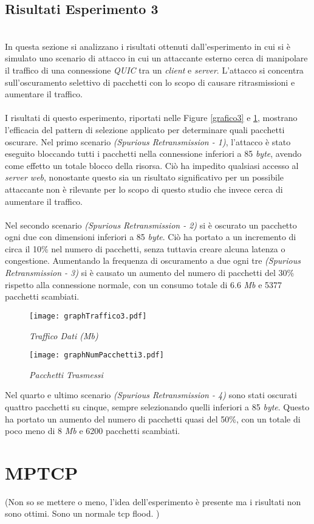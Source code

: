 \subsection{Risultati Esperimento 3}
~\\
\indent In questa sezione si analizzano i risultati ottenuti dall’esperimento in cui si è simulato
uno scenario di attacco in cui un attaccante esterno cerca di manipolare il traffico di una connessione \emph{QUIC} tra un \emph{client} e \emph{server}.
L'attacco si concentra sull'oscuramento selettivo di pacchetti con lo scopo di causare ritrasmissioni e aumentare il traffico.
\\\\
I risultati di questo esperimento, riportati nelle Figure \ref{grafico3} e \ref{grafico32}, mostrano l'efficacia del pattern di selezione applicato per determinare quali pacchetti oscurare. 
Nel primo scenario \emph{(Spurious Retransmission - 1)}, l'attacco è stato eseguito bloccando tutti i pacchetti nella connessione inferiori a 85 \emph{byte}, avendo come effetto un totale blocco della risorsa.
Ciò ha impedito qualsiasi accesso al \emph{server web}, nonostante questo sia un risultato significativo per un possibile attaccante non è rilevante per lo scopo di questo studio che invece cerca di aumentare il traffico.
\\\\
Nel secondo scenario \emph{(Spurious Retransmission - 2)} si è oscurato un pacchetto ogni due con dimensioni inferiori a 85 \emph{byte}. Ciò ha portato a un incremento di circa il 10\% nel numero di pacchetti, senza tuttavia creare alcuna latenza o congestione.
Aumentando la frequenza di oscuramento a due ogni tre \emph{(Spurious Retransmission - 3)} si è causato un aumento del numero di pacchetti del 30\% rispetto alla connessione normale, con un consumo totale di 6.6 \emph{Mb} e 5377 pacchetti scambiati.
\begin{figure}[ht]
    \centering
    \begin{minipage}{0.48\textwidth}
        \centering
        \texttt{[image: graphTraffico3.pdf]}
        \caption{\emph{Traffico Dati (Mb)}}
        \label{grafico3}
    \end{minipage}
    \hfill
    \begin{minipage}{0.48\textwidth}
        \centering 
        \texttt{[image: graphNumPacchetti3.pdf]}
        \caption{\emph{Pacchetti Trasmessi}}
        \label{grafico32}
    \end{minipage}
\end{figure}
Nel quarto e ultimo scenario \emph{(Spurious Retransmission - 4)} sono stati oscurati quattro pacchetti su cinque, sempre selezionando quelli inferiori a 85 \emph{byte}.
Questo ha portato un aumento del numero di pacchetti quasi del 50\%, con un totale di poco meno di 8 \emph{Mb} e 6200 pacchetti scambiati. 
\section{MPTCP}

(Non so se mettere o meno, l'idea dell'esperimento è presente ma i risultati non sono ottimi. Sono un normale tcp flood. )
